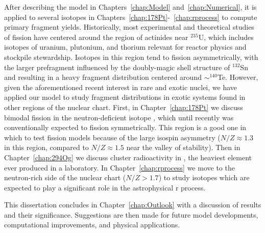 After describing the model in Chapters~\ref{chap:Model} and~\ref{chap:Numerical}, it is applied to several isotopes in Chapters~\ref{chap:178Pt}-~\ref{chap:rprocess} to compute primary fragment yields. Historically, most experimental and theoretical studies of fission have centered around the region of actinides near $^{235}$U, which includes isotopes of uranium, plutonium, and thorium relevant for reactor physics and stockpile stewardship. Isotopes in this region tend to fission asymmetrically, with the larger prefragment influenced by the doubly-magic shell structure of $^{132}$Sn and resulting in a heavy fragment distribution centered around ${\sim}^{140}$Te. However, given the aforementioned recent interest in rare and exotic nuclei, we have applied our model to study fragment distributions in exotic systems found in other regions of the nuclear chart. First, in Chapter~\ref{chap:178Pt} we discuss bimodal fission in the neutron-deficient isotope {\Pt}, which until recently was conventionally expected to fission symmetrically. This region is a good one in which to test fission models because of the large isospin asymmetry ($N/Z\approx1.3$ in this region, compared to $N/Z\approx1.5$ near the valley of stability). Then in Chapter~\ref{chap:294Og} we discuss cluster radioactivity in {\Og}, the heaviest element ever produced in a laboratory. In Chapter~\ref{chap:rprocess} we move to the neutron-rich side of the nuclear chart ($N/Z>1.7$) to study isotopes which are expected to play a significant role in the astrophysical r process. %



This dissertation concludes in Chapter~\ref{chap:Outlook} with a discussion of results and their significance. Suggestions are then made for future model developments, computational improvements, and physical applications.
